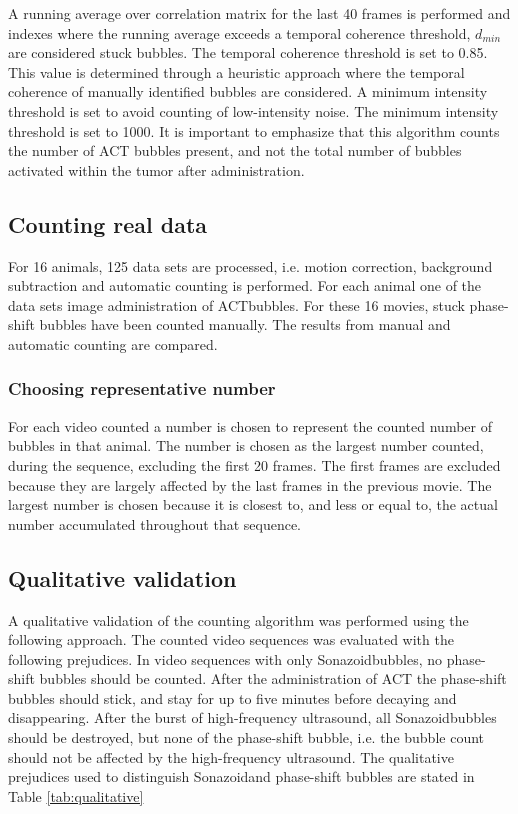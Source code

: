 
A running average over correlation matrix for the last 40 frames is performed and indexes where the running average exceeds a temporal coherence threshold, $d_{min}$ are considered stuck bubbles. The temporal coherence threshold is set to 0.85. This value is determined through a heuristic approach where the temporal coherence of manually identified bubbles are considered. A minimum intensity threshold is set to avoid counting of low-intensity noise. The minimum intensity threshold is set to 1000. It is important to emphasize that this algorithm counts the number of ACT bubbles present, and not the total number of bubbles activated within the tumor after administration.  

\subsection{Counting real data}
For 16 animals, 125 data sets are processed, i.e. motion correction, background subtraction and automatic counting is performed. For each animal one of the data sets image administration of ACT\texttrademark bubbles. For these 16 movies, stuck phase-shift bubbles have been counted manually\cite{Healey2014}. The results from manual and automatic counting are compared.

\subsubsection{Choosing representative number} 
For each video counted a number is chosen to represent the counted number of bubbles in that animal. The number is chosen as the largest number counted, during the sequence, excluding the first 20 frames. The first frames are excluded because they are largely affected by the last frames in the previous movie. The largest number is chosen because it is closest to, and less or equal to, the actual number accumulated throughout that sequence. 

\subsection{Qualitative validation}
\label{sec:qualitative}
A qualitative validation of the counting algorithm was performed using the following approach. The counted video sequences was evaluated with the following prejudices. In video sequences with only Sonazoid\texttrademark bubbles, no phase-shift bubbles should be counted. After the administration of ACT the phase-shift bubbles should stick, and stay for up to five minutes before decaying and disappearing. After the burst of high-frequency ultrasound, all Sonazoid\texttrademark bubbles should be destroyed, but none of the phase-shift bubble, i.e. the bubble count should not be affected by the high-frequency ultrasound. The qualitative prejudices used to distinguish Sonazoid\texttrademark and phase-shift bubbles are stated in Table \ref{tab:qualitative}



